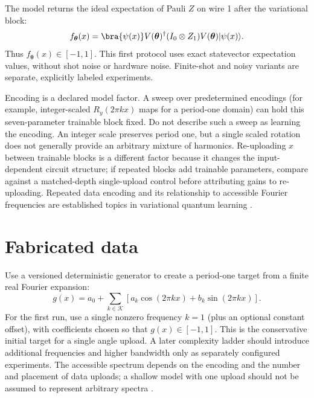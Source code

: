 \documentclass[11pt]{article}
\newcommand{\ket}[1]{\lvert #1\rangle}
\begin{document}
The model returns the ideal expectation of Pauli $Z$ on wire 1 after the variational block:
\begin{equation}
  f_{\boldsymbol{\theta}}(x)
  = \bra{\psi(x)}V(\boldsymbol{\theta})^\dagger
    (I_0\otimes Z_1)V(\boldsymbol{\theta})\ket{\psi(x)}.
  \label{eq:readout}
\end{equation}
Thus $f_{\boldsymbol{\theta}}(x)\in[-1,1]$. This first protocol uses exact statevector expectation values, without shot noise or hardware noise. Finite-shot and noisy variants are separate, explicitly labeled experiments.

Encoding is a declared model factor. A sweep over predetermined encodings (for example, integer-scaled $R_y(2\pi kx)$ maps for a period-one domain) can hold this seven-parameter trainable block fixed. Do not describe such a sweep as learning the encoding. An integer scale preserves period one, but a single scaled rotation does not generally provide an arbitrary mixture of harmonics. Re-uploading $x$ between trainable blocks is a different factor because it changes the input-dependent circuit structure; if repeated blocks add trainable parameters, compare against a matched-depth single-upload control before attributing gains to re-uploading. Repeated data encoding and its relationship to accessible Fourier frequencies are established topics in variational quantum learning \cite{schuld2021,perez2020}.

\section{Fabricated data}

Use a versioned deterministic generator to create a period-one target from a finite real Fourier expansion:
\begin{equation}
  g(x)=a_0+\sum_{k\in\mathcal{K}}
  \left[a_k\cos(2\pi kx)+b_k\sin(2\pi kx)\right].
  \label{eq:target}
\end{equation}
For the first run, use a single nonzero frequency $k=1$ (plus an optional constant offset), with coefficients chosen so that $g(x)\in[-1,1]$. This is the conservative initial target for a single angle upload. A later complexity ladder should introduce additional frequencies and higher bandwidth only as separately configured experiments. The accessible spectrum depends on the encoding and the number and placement of data uploads; a shallow model with one upload should not be assumed to represent arbitrary spectra \cite{schuld2021}.
\end{document}
